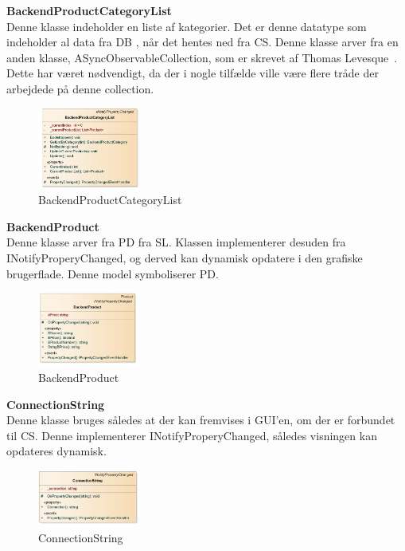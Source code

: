 \textbf{BackendProductCategoryList}\\
Denne klasse indeholder en liste af kategorier. Det er denne datatype som indeholder al data fra \gls{DB} , når det hentes ned fra \gls{CS}. Denne klasse arver fra en anden klasse, ASyncObservableCollection, som er skrevet af Thomas Levesque~\cite{ASYNC}. Dette har været nødvendigt, da der i nogle tilfælde ville være flere tråde der arbejdede på denne collection.
\begin{center}
\begin{figure}[!h]
    \centering
    \includegraphics[width=0.30\textwidth]{Systemdesign/backend/klassebeskrivelser/Images/BPCList.png}
    \caption{BackendProductCategoryList}
    \label{fig:modelhandler}
\end{figure}
\end{center}
\label{Modelhandler_Beskrivelse}
 \bigskip 
 
 \textbf{BackendProduct}\\
Denne klasse arver fra \gls{PD} fra \gls{SL}. Klassen implementerer desuden fra INotifyProperyChanged, og derved kan dynamisk opdatere i den grafiske brugerflade. Denne model symboliserer \gls{PD}.
\begin{center}
\begin{figure}[!h]
    \centering
    \includegraphics[width=0.30\textwidth]{Systemdesign/backend/klassebeskrivelser/Images/Backendproduct.png}
    \caption{BackendProduct}
    \label{fig:modelhandler}
\end{figure}
\end{center}
\label{Modelhandler_Beskrivelse}
 \bigskip 
 
 
  \textbf{ConnectionString}\\
Denne klasse bruges således at der kan fremvises i GUI'en, om der er forbundet til \gls{CS}. Denne implementerer INotifyProperyChanged, således visningen kan opdateres dynamisk.
\begin{center}
\begin{figure}[!h]
    \centering
    \includegraphics[width=0.30\textwidth]{Systemdesign/backend/klassebeskrivelser/Images/const.png}
    \caption{ConnectionString}
    \label{fig:modelhandler}
\end{figure}
\end{center}
\label{Modelhandler_Beskrivelse}
 \bigskip 


